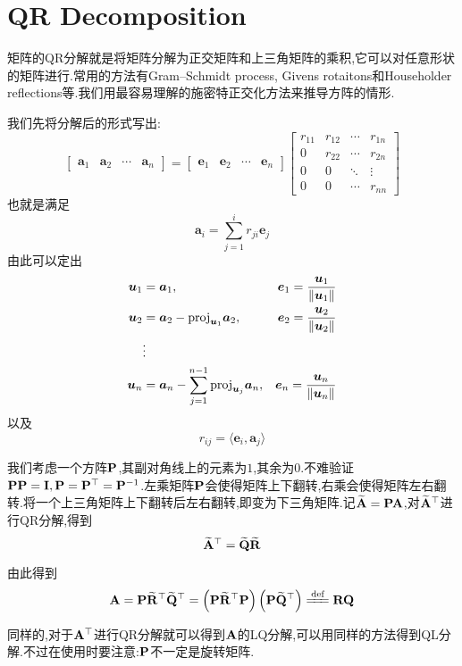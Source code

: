 \chapter{QR Decomposition}
\label{QR Decomposition}
矩阵的QR分解就是将矩阵分解为正交矩阵和上三角矩阵的乘积,它可以对任意形状的矩阵进行.常用的方法有Gram–Schmidt process, Givens rotaitons和Householder reflections等.我们用最容易理解的施密特正交化方法来推导方阵的情形.

我们先将分解后的形式写出:
\begin{equation}
	\begin{bmatrix}
		\bm a_1 & \bm a_2 & \cdots & \bm a_n
	\end{bmatrix}
	=
	\begin{bmatrix}
		\bm e_1 & \bm e_2 & \cdots & \bm e_n
	\end{bmatrix}
	\begin{bmatrix}
		r_{11} & r_{12}  & \cdots & r_{1n}
		\\
		0 & r_{22} & \cdots  & r_{2n}
		\\
		0 & 0 & \ddots & \vdots
		\\
		0 & 0 & \cdots & r_{nn}
	\end{bmatrix}
\end{equation}
也就是满足
\begin{equation}
	\bm a_i = \sum_{j = 1}^{i} r_{ji} \bm e_j
\end{equation}
由此可以定出
\begin{equation}
	\begin{aligned}
		\bm u_1 &= \bm a_1, \quad &\bm e_1 = \frac{\bm u_1}{\left \Vert \bm u_1 \right \Vert}
		\\
		\bm u_2 &= \bm a_2 - \text{proj}_{\bm u_1} \bm a_2, & \bm e_2 = \frac{\bm u_2}{\left \Vert \bm u_2 \right \Vert}
		\\
		&\vdots 
		\\
		\bm u_n &= \bm a_n - \sum_{j=1}^{n-1} \text{proj}_{\bm u_j} \bm a_n , &\bm e_n = \frac{\bm u_n}{\left \Vert \bm u_n \right \Vert}
	\end{aligned} 
\end{equation}
以及
\begin{equation}
	r_{ij} = \langle \bm e_i, \bm a_j \rangle
\end{equation}

我们考虑一个方阵$\bold{P}$,其副对角线上的元素为$1$,其余为$0$.不难验证$\bold{P}\bold{P} = \bold{I}, \bold{P} = \bold{P}^\top = \bold{P}^{-1}$.左乘矩阵$\bold{P}$会使得矩阵上下翻转,右乘会使得矩阵左右翻转.将一个上三角矩阵上下翻转后左右翻转,即变为下三角矩阵.记$\widetilde{\bold{A}} = \bold{P} \bold{A}$,对$\widetilde{\bold{A}}^\top$进行QR分解,得到
\begin{equation}
	\widetilde{\bold{A}}^\top = \widetilde{\bold{Q}} \widetilde{\bold{R}}
\end{equation}

由此得到
\begin{equation}
	\bd A = \bd P \widetilde{\bd R}^\top \widetilde{\bd Q}^\top = \xk{\bd P \widetilde{\bd R}^\top \bd P} \xk{\bd P \widetilde{\bd Q}^\top} \xlongequal{\text{def}} \bd R \bd Q
\end{equation}

同样的,对于$\bold{A}^{\top}$进行QR分解就可以得到$\bold{A}$的LQ分解,可以用同样的方法得到QL分解.不过在使用时要注意:$\bold{P}$不一定是旋转矩阵.